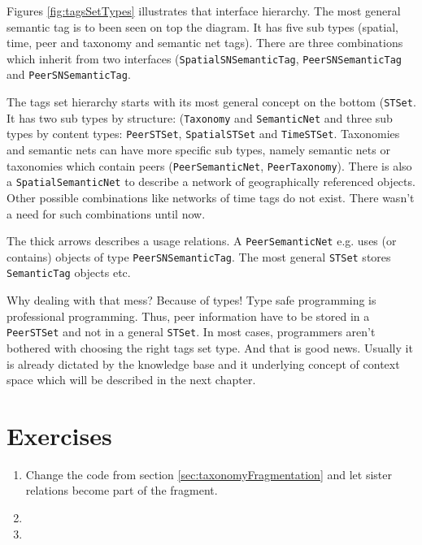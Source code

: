 Figures \ref{fig:tagsSetTypes} illustrates that interface hierarchy. The most general semantic tag is to been seen on top the diagram. It has five sub types (spatial, time, peer and taxonomy and semantic net tags). There are three combinations which inherit from two interfaces 
({\tt SpatialSNSemanticTag}, {\tt PeerSNSemanticTag} and 
{\tt PeerSNSemanticTag}.

The tags set hierarchy starts with its most general concept on the bottom ({\tt STSet}. It has two sub types by structure: ({\tt Taxonomy} and {\tt SemanticNet} and three sub types by content types: {\tt PeerSTSet}, {\tt SpatialSTSet} and {\tt TimeSTSet}. Taxonomies and semantic nets can have more specific sub types, namely semantic nets or taxonomies which contain peers ({\tt PeerSemanticNet}, {\tt PeerTaxonomy}). There is also a {\tt SpatialSemanticNet} to describe a network of geographically referenced objects. Other possible combinations like networks of time tags do not exist. There wasn't a need for such combinations until now.

The thick arrows describes a usage relations. A {\tt PeerSemanticNet} e.g. uses (or contains) objects of type {\tt PeerSNSemanticTag}. The most general {\tt STSet} stores {\tt SemanticTag} objects etc.

Why dealing with that mess? Because of types! Type safe programming is professional programming. Thus, peer information have to be stored in a {\tt PeerSTSet} and not in a general {\tt STSet}. In most cases, programmers aren't bothered with choosing the right tags set type. And that is good news. Usually it is already dictated by the knowledge base and it underlying concept of context space which will be described in the next chapter.

\section{Exercises}
\begin{enumerate}
\item 
Change the code from section \ref{sec:taxonomyFragmentation} and let sister relations become part of the fragment.
\item 
\item 

\end{enumerate}
